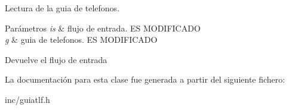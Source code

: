 Lectura de la guia de telefonos. 


\begin{DoxyParams}{Parámetros}
{\em is} & flujo de entrada. ES M\+O\+D\+I\+F\+I\+C\+A\+DO \\
\hline
{\em g} & guia de telefonos. ES M\+O\+D\+I\+F\+I\+C\+A\+DO \\
\hline
\end{DoxyParams}
\begin{DoxyReturn}{Devuelve}
el flujo de entrada 
\end{DoxyReturn}


La documentación para esta clase fue generada a partir del siguiente fichero\+:\begin{DoxyCompactItemize}
\item 
inc/guiatlf.\+h\end{DoxyCompactItemize}
